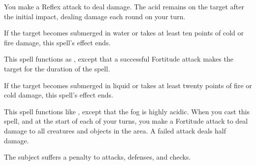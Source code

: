 \spellrng{\rngmed}
\begin{spelleffect}
    You make a Reflex attack to deal damage. The acid remains on the target after the initial impact, dealing damage each round on your turn.
\end{spelleffect}
\begin{spellnotes}
  If the target becomes submerged in water or takes at least ten points of cold or fire damage, this spell's effect ends.
\end{spellnotes}


\spellrng{\rngfar}
\begin{spelleffect}
  This spell functions as , except that a successful Fortitude attack makes the target \vulnerable for the duration of the spell.
\end{spelleffect}
\begin{spellnotes}
   If the target becomes submerged in liquid or takes at least twenty points of fire or cold damage, this spell's effect ends.
\end{spellnotes}

\spellrng{\rngmed}
\spelldur{\durshort}
\begin{spelleffect}
  This spell functions like , except that the fog is highly acidic. When you cast this spell, and at the start of each of your turns, you make a Fortitude attack to deal damage to all creatures and objects in the area. A failed attack deals half damage.
\end{spelleffect}

\spellrng{\rngmed}
\begin{spelleffect}
  The subject suffers a  penalty to attacks, defenses, and checks.
\end{spelleffect}


